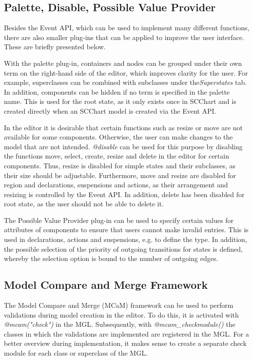 \subsection{Palette, Disable, Possible Value Provider}
Besides the Event API, which can be used to implement many different functions, there are also smaller plug-ins that can be applied to improve the user interface. These are briefly presented below.

With the palette plug-in, containers and nodes can be grouped under their own term on the right-hand side of the editor, which improves clarity for the user. For example, superclasses can be combined with subclasses under the\textit{Superstates} tab. In addition, components can be hidden if no term is specified in the palette name. This is used for the root state, as it only exists once in SCChart and is created directly when an SCChart model is created via the Event API.

In the editor it is desirable that certain functions such as resize or move are not available for some components. Otherwise, the user can make changes to the model that are not intended. \textit{@disable} can be used for this purpose by disabling the functions move, select, create, resize and delete in the editor for certain components. Thus, resize is disabled for simple states and their subclasses, as their size should be adjustable. Furthermore, move and resize are disabled for region and declarations, suspensions and actions, as their arrangement and resizing is controlled by the Event API. In addition, delete has been disabled for root state, as the user should not be able to delete it.

The Possible Value Provider plug-in can be used to specify certain values for attributes of components to ensure that users cannot make invalid entries. This is used in declarations, actions and suspensions, e.g. to define the type. In addition, the possible selection of the priority of outgoing transitions for states is defined, whereby the selection option is bound to the number of outgoing edges.

\subsection{Model Compare and Merge Framework}
The Model Compare and Merge (MCaM) framework can be used to perform validations during model creation in the editor. To do this, it is activated with \textit{@mcam("check")} in the MGL. Subsequently, with \textit{@mcam\_checkmodule()} the classes in which the validations are implemented are registered in the MGL. For a better overview during implementation, it makes sense to create a separate check module for each class or superclass of the MGL.

